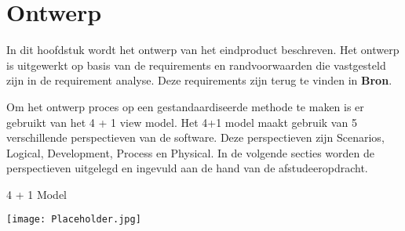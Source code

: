 \chapter{Ontwerp}
In dit hoofdstuk wordt het ontwerp van het eindproduct beschreven.
Het ontwerp is uitgewerkt op basis van de requirements en randvoorwaarden die vastgesteld zijn in de requirement analyse.
Deze requirements zijn terug te vinden in \textbf{Bron}.

\whitespace
Om het ontwerp proces op een gestandaardiseerde methode te maken is er gebruikt van het 4 + 1 view model.
Het 4+1 model maakt gebruik van 5 verschillende perspectieven van de software.
Deze perspectieven zijn Scenarios, Logical, Development, Process en Physical.
In de volgende secties worden de perspectieven uitgelegd en ingevuld aan de hand van de afstudeeropdracht.

\whitespace
\begin{graphic}
	\captionsetup{type=figure}
	\caption{4 + 1 Model}
	\texttt{[image: Placeholder.jpg]}
	\label{fig:4p1Model}
\end{graphic}

\newpage





